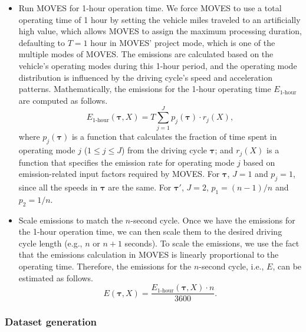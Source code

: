 \documentclass[12pt,english]{article}
\begin{document}
\begin{itemize}
    \item Run MOVES for 1-hour operation time. 
    We force MOVES to use a total operating time of 1 hour by setting the vehicle miles traveled to an artificially high value, which allows MOVES to assign the maximum processing duration, defaulting to $T = 1$ hour in MOVES' project mode, which is one of the multiple modes of MOVES. The emissions are calculated based on the vehicle's operating modes during this 1-hour period, and the operating mode distribution is influenced by the driving cycle's speed and acceleration patterns. Mathematically, the emissions for the 1-hour operating time $E_\text{1-hour}$ are computed as follows.
    \begin{equation}
        E_\text{1-hour}(\boldsymbol\tau, X) = T \sum_{j=1}^J p_j(\boldsymbol\tau) \cdot r_j(X),
    \end{equation}
    where $p_j(\boldsymbol{\tau})$ is a function that calculates the fraction of time spent in operating mode $j$ ($1\leq j\leq J$) from the driving cycle $\boldsymbol{\tau}$; and $r_j(X)$ is a function that specifies the emission rate for operating mode $j$ based on emission-related input factors required by MOVES.
    For $\boldsymbol{\tau}$, $J=1$ and $p_j=1$, since all the speeds in $\boldsymbol{\tau}$ are the same.
    For $\boldsymbol{\tau}'$, $J=2$, $p_1=(n-1)/n$ and $p_2=1/n$.

    \item Scale emissions to match the $n$-second cycle. Once we have the emissions for the 1-hour operation time, we can then scale them to the desired driving cycle length (e.g., $n$ or $n+1$ seconds). To scale the emissions, we use the fact that the emissions calculation in MOVES is linearly proportional to the operating time. Therefore, the emissions for the $n$-second cycle, i.e., $E$, can be estimated as follows.
    \begin{equation}
        E(\boldsymbol\tau, X) = \frac{E_\text{1-hour}(\boldsymbol\tau, X) \cdot n}{3600}.
    \end{equation}
\end{itemize}




\subsubsection{Dataset generation}\label{sec:DatasetGeneration}
\end{document}
